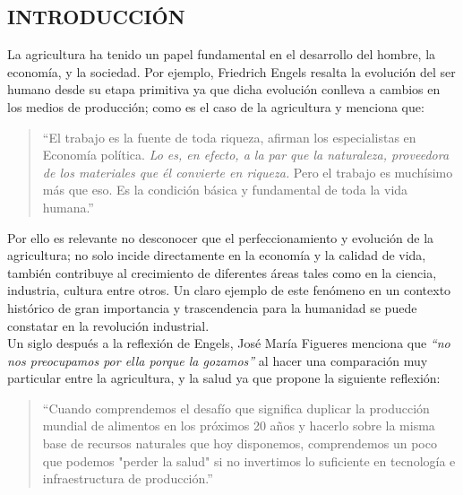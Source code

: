 
\begin{center}
\section*{INTRODUCCIÓN}
\end{center}


\noindent La agricultura ha tenido un papel fundamental en el desarrollo del hombre, la econom\'ia, y la sociedad. Por ejemplo, Friedrich Engels resalta la evoluci\'on del ser humano desde su etapa primitiva ya que dicha evoluci\'on conlleva a cambios en los medios de producci\'on; como es el caso de la agricultura y menciona que:\\

\begin{quotation}
	``El trabajo es la fuente de toda riqueza, afirman los especialistas en Economía pol\'itica. \textit{Lo es, en efecto, a la par que la naturaleza, proveedora de los materiales que \'el convierte en riqueza.} Pero el trabajo es much\'isimo m\'as que eso. Es la condición b\'asica y fundamental de toda la vida humana.''
	\cite{FriedrichEngels1876} 
\end{quotation}

\noindent Por ello es relevante no desconocer que el perfeccionamiento y evoluci\'on de la agricultura; no solo incide directamente en la econom\'ia y la calidad de vida, tambi\'en contribuye al crecimiento de diferentes \'areas tales como en la ciencia, industria, cultura entre otros. Un claro ejemplo de este fen\'omeno en un contexto hist\'orico de gran importancia y trascendencia para la humanidad se puede constatar  en la revoluci\'on industrial. \cite{KrismarEducacion2017} \\

\noindent Un siglo despu\'es a la reflexi\'on de Engels, Jos\'e Mar\'ia Figueres menciona que \textit{``no nos preocupamos por ella porque la gozamos''} \cite{JoseMariaFigueres1998} al hacer una comparaci\'on muy particular entre la agricultura, y la salud ya que propone la siguiente reflexi\'on:

\begin{quotation}
	``Cuando comprendemos el desaf\'io que significa duplicar la producci\'on mundial de alimentos en los pr\'oximos 20 años y hacerlo sobre la misma base de recursos naturales que hoy disponemos, comprendemos un poco que podemos "perder la salud" si no invertimos lo suficiente en tecnolog\'ia e infraestructura de producci\'on.'' \cite{JoseMariaFigueres1998}
\end{quotation}

